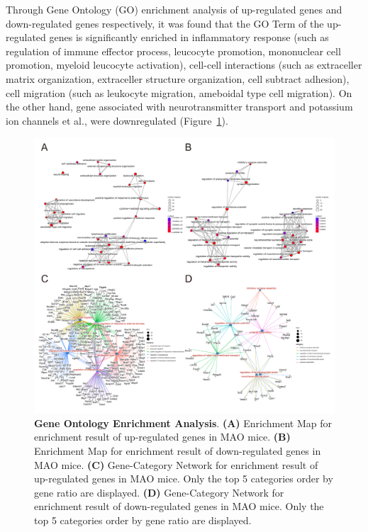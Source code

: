 \documentclass[
  a4paper,
]{article}
\begin{document}
Through Gene Ontology (GO) enrichment analysis of up-regulated genes and
down-regulated genes respectively, it was found that the GO Term of the
up-regulated genes is significantly enriched in inflammatory response
(such as regulation of immune effector process, leucocyte promotion,
mononuclear cell promotion, myeloid leucocyte activation), cell-cell
interactions (such as extraceller matrix organization, extraceller
structure organization, cell subtract adhesion), cell migration (such as
leukocyte migration, ameboidal type cell migration). On the other hand,
gene associated with neurotransmitter transport and potassium ion
channels et al., were downregulated (Figure~\ref{fig-go}).

\begin{figure}[H]

{\centering \includegraphics{./figure/Figure-4.pdf}

}

\caption{\label{fig-go}\textbf{Gene Ontology Enrichment Analysis}.
\textbf{(A)} Enrichment Map for enrichment result of up-regulated genes
in MAO mice. \textbf{(B)} Enrichment Map for enrichment result of
down-regulated genes in MAO mice. \textbf{(C)} Gene-Category Network for
enrichment result of up-regulated genes in MAO mice. Only the top 5
categories order by gene ratio are displayed. \textbf{(D)} Gene-Category
Network for enrichment result of down-regulated genes in MAO mice. Only
the top 5 categories order by gene ratio are displayed.}

\end{figure}
\end{document}
